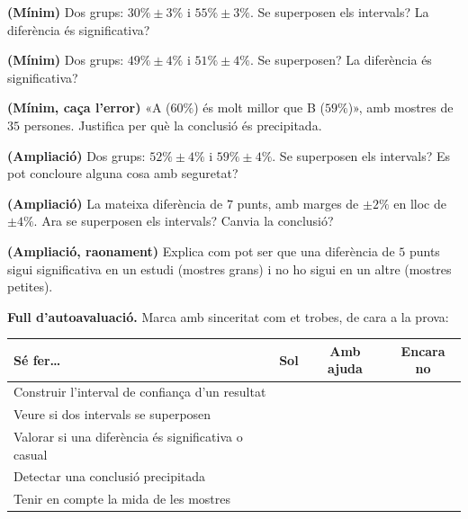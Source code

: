 \begin{exercicis}
\begin{exlist}
  \item \textbf{(Mínim)} Dos grups: $30\%\pm 3\%$ i $55\%\pm 3\%$. Se superposen els
        intervals? La diferència és significativa?
  \item \textbf{(Mínim)} Dos grups: $49\%\pm 4\%$ i $51\%\pm 4\%$. Se superposen? La
        diferència és significativa?
  \item \textbf{(Mínim, caça l'error)} «A ($60\%$) és molt millor que B ($59\%$)», amb
        mostres de $35$ persones. Justifica per què la conclusió és precipitada.
  \item \textbf{(Ampliació)} Dos grups: $52\%\pm 4\%$ i $59\%\pm 4\%$. Se superposen els
        intervals? Es pot concloure alguna cosa amb seguretat?
  \item \textbf{(Ampliació)} La mateixa diferència de $7$ punts, amb marges de $\pm 2\%$ en
        lloc de $\pm 4\%$. Ara se superposen els intervals? Canvia la conclusió?
  \item \textbf{(Ampliació, raonament)} Explica com pot ser que una diferència de $5$ punts
        sigui significativa en un estudi (mostres grans) i no ho sigui en un altre (mostres
        petites).
\end{exlist}
\end{exercicis}

\begin{idea}
\textbf{Full d'autoavaluació.} Marca amb sinceritat com et trobes, de cara a la prova:
\begin{center}
\renewcommand{\arraystretch}{1.4}
\begin{tabular}{p{8.4cm} c c c}
\toprule
\textbf{Sé fer\dots} & \textbf{Sol} & \textbf{Amb ajuda} & \textbf{Encara no} \\
\midrule
Construir l'interval de confiança d'un resultat & & & \\
Veure si dos intervals se superposen & & & \\
Valorar si una diferència és significativa o casual & & & \\
Detectar una conclusió precipitada & & & \\
Tenir en compte la mida de les mostres & & & \\
\bottomrule
\end{tabular}
\end{center}
\end{idea}


